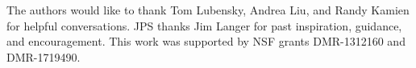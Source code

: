 \documentclass[aps,prl,reprint]{revtex4-1}
\begin{document}
\begin{acknowledgments}
  The authors would like to thank Tom Lubensky, Andrea Liu, and Randy Kamien
  for helpful conversations. JPS thanks Jim Langer for past inspiration,
  guidance, and encouragement. This work was supported by NSF grants
  DMR-1312160 and DMR-1719490.
\end{acknowledgments}


\end{document}
